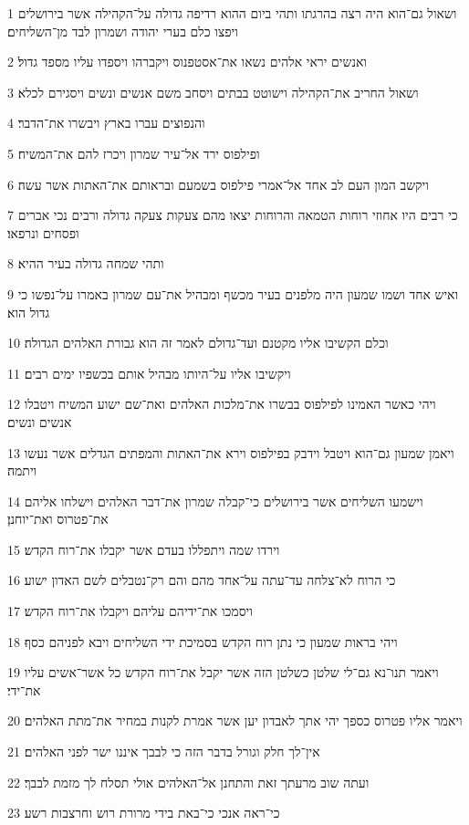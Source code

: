 \par 1 ושאול גם־הוא היה רצה בהרגתו ותהי ביום ההוא רדיפה גדולה על־הקהילה אשר בירושלים ויפצו כלם בערי יהודה ושמרון לבד מן־השליחים׃
\par 2 ואנשים יראי אלהים נשאו את־אסטפנוס ויקברהו ויספדו עליו מספד גדול׃
\par 3 ושאול החריב את־הקהילה וישוטט בבתים ויסחב משם אנשים ונשים ויסגירם לכלא׃
\par 4 והנפוצים עברו בארץ ויבשרו את־הדבר׃
\par 5 ופילפוס ירד אל־עיר שמרון ויכרז להם את־המשיח׃
\par 6 ויקשב המון העם לב אחד אל־אמרי פילפוס בשמעם ובראותם את־האתות אשר עשה׃
\par 7 כי רבים היו אחוזי רוחות הטמאה והרוחות יצאו מהם צעקות צעקה גדולה ורבים נכי אברים ופסחים ונרפאו׃
\par 8 ותהי שמחה גדולה בעיר ההיא׃
\par 9 ואיש אחד ושמו שמעון היה מלפנים בעיר מכשף ומבהיל את־עם שמרון באמרו על־נפשו כי גדול הוא׃
\par 10 וכלם הקשיבו אליו מקטנם ועד־גדולם לאמר זה הוא גבורת האלהים הגדולה׃
\par 11 ויקשיבו אליו על־היותו מבהיל אותם בכשפיו ימים רבים׃
\par 12 ויהי כאשר האמינו לפילפוס בבשרו את־מלכות האלהים ואת־שם ישוע המשיח ויטבלו אנשים ונשים׃
\par 13 ויאמן שמעון גם־הוא ויטבל וידבק בפילפוס וירא את־האתות והמפתים הגדלים אשר נעשו ויתמה׃
\par 14 וישמעו השליחים אשר בירושלים כי־קבלה שמרון את־דבר האלהים וישלחו אליהם את־פטרוס ואת־יוחנן׃
\par 15 וירדו שמה ויתפללו בעדם אשר יקבלו את־רוח הקדש׃
\par 16 כי הרוח לא־צלחה עד־עתה על־אחד מהם והם רק־נטבלים לשם האדון ישוע׃
\par 17 ויסמכו את־ידיהם עליהם ויקבלו את־רוח הקדש׃
\par 18 ויהי בראות שמעון כי נתן רוח הקדש בסמיכת ידי השליחים ויבא לפניהם כסף׃
\par 19 ויאמר תנו־נא גם־לי שלטן כשלטן הזה אשר יקבל את־רוח הקדש כל אשר־אשים עליו את־ידי׃
\par 20 ויאמר אליו פטרוס כספך יהי אתך לאבדון יען אשר אמרת לקנות במחיר את־מתת האלהים׃
\par 21 אין־לך חלק וגורל בדבר הזה כי לבבך איננו ישר לפני האלהים׃
\par 22 ועתה שוב מרעתך זאת והתחנן אל־האלהים אולי תסלח לך מזמת לבבך׃
\par 23 כי־ראה אנכי כי־באת בידי מרורת רוש וחרצבות רשע׃
